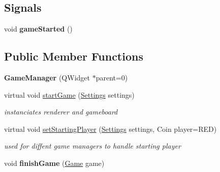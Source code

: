 \subsection*{\-Signals}
\begin{DoxyCompactItemize}
\item 
\hypertarget{classGameManager_ae63cd6e5b6b2458d5260d421433aa43c}{void {\bfseries game\-Started} ()}\label{classGameManager_ae63cd6e5b6b2458d5260d421433aa43c}

\end{DoxyCompactItemize}
\subsection*{\-Public \-Member \-Functions}
\begin{DoxyCompactItemize}
\item 
\hypertarget{classGameManager_a22f8d699d465b1246ed1ca95cb5e8126}{{\bfseries \-Game\-Manager} (\-Q\-Widget $\ast$parent=0)}\label{classGameManager_a22f8d699d465b1246ed1ca95cb5e8126}

\item 
\hypertarget{classGameManager_a4acbc34fa6c280d0f6d48ff867626ce2}{virtual void \hyperlink{classGameManager_a4acbc34fa6c280d0f6d48ff867626ce2}{start\-Game} (\hyperlink{structSettings}{\-Settings} settings)}\label{classGameManager_a4acbc34fa6c280d0f6d48ff867626ce2}

\begin{DoxyCompactList}\small\item\em instanciates renderer and gameboard \end{DoxyCompactList}\item 
\hypertarget{classGameManager_a6ec9d87c1a6366be0f5b2191b798a679}{virtual void \hyperlink{classGameManager_a6ec9d87c1a6366be0f5b2191b798a679}{set\-Starting\-Player} (\hyperlink{structSettings}{\-Settings} settings, \-Coin player=\-R\-E\-D)}\label{classGameManager_a6ec9d87c1a6366be0f5b2191b798a679}

\begin{DoxyCompactList}\small\item\em used for diffent game managers to handle starting player \end{DoxyCompactList}\item 
\hypertarget{classGameManager_afc363c6765b4fdf990f75bd5978a9dbb}{void {\bfseries finish\-Game} (\hyperlink{structGame}{\-Game} game)}\label{classGameManager_afc363c6765b4fdf990f75bd5978a9dbb}

\end{DoxyCompactItemize}
